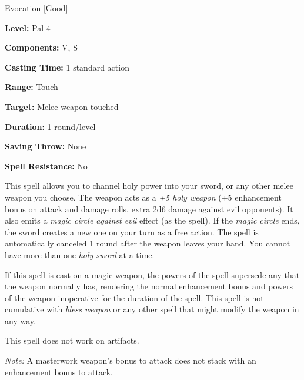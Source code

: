 
Evocation [Good]

\textbf{Level:} Pal 4

\textbf{Components:} V, S

\textbf{Casting Time:} 1 standard action

\textbf{Range:} Touch

\textbf{Target:} Melee weapon touched

\textbf{Duration:} 1 round/level

\textbf{Saving Throw:} None

\textbf{Spell Resistance:} No

This spell allows you to channel holy power into your sword, or any other melee 
weapon you choose. The weapon acts as a \textit{+5 holy weapon} (+5 enhancement 
bonus on attack and damage rolls, extra 2d6 damage against evil opponents). It 
also emits a \textit{magic circle against evil} effect (as the spell). If the \textit{magic 
circle} ends, the sword creates a new one on your turn as a free action. The spell 
is automatically canceled 1 round after the weapon leaves your hand. You cannot 
have more than one \textit{holy sword} at a time.

If this spell is cast on a magic weapon, the powers of the spell supersede any 
that the weapon normally has, rendering the normal enhancement bonus and powers 
of the weapon inoperative for the duration of the spell. This spell is not cumulative 
with \textit{bless weapon} or any other spell that might modify the weapon in any 
way.

This spell does not work on artifacts.

\textit{Note:} A masterwork weapon's bonus to attack does not stack with an enhancement 
bonus to attack.

